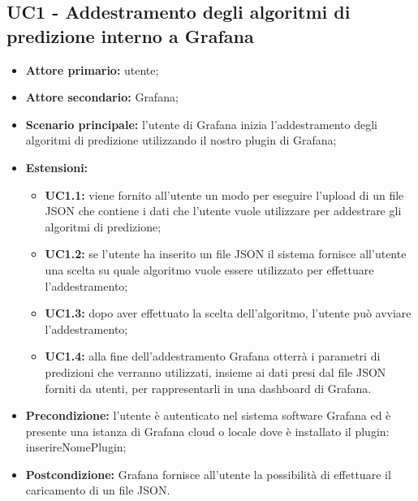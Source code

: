 \documentclass{article}
\begin{document}
	\subsection{UC1 - Addestramento degli algoritmi di predizione interno a Grafana}
	\begin{itemize}
		\item \textbf{Attore primario:} utente;
		\item \textbf{Attore secondario:} Grafana;
		\item \textbf{Scenario principale:} l'utente di Grafana inizia l'addestramento degli algoritmi di predizione utilizzando il nostro plugin di Grafana;
		\item \textbf{Estensioni:}
			\begin{itemize}
				\item \textbf{UC1.1:} viene fornito all'utente un modo per eseguire l'upload di un file JSON che contiene i dati che l'utente vuole utilizzare per addestrare gli algoritmi di predizione;
				\item \textbf{UC1.2:} se l'utente ha inserito un file JSON il sistema fornisce all'utente una scelta su quale algoritmo vuole essere utilizzato per effettuare l'addestramento;
				\item \textbf{UC1.3:} dopo aver effettuato la scelta dell'algoritmo, l'utente può avviare l'addestramento;
				\item \textbf{UC1.4:} alla fine dell'addestramento Grafana otterrà i parametri di predizioni che verranno utilizzati, insieme ai dati presi dal file JSON forniti da utenti, per rappresentarli in una dashboard di Grafana.
			\end{itemize}
		\item \textbf{Precondizione:} l'utente è autenticato nel sistema software Grafana ed è presente una istanza di Grafana cloud o locale dove è installato il plugin: inserireNomePlugin;
		\item \textbf{Postcondizione:} Grafana fornisce all'utente la possibilità di effettuare il caricamento di un file JSON.
	\end{itemize}
\end{document}
